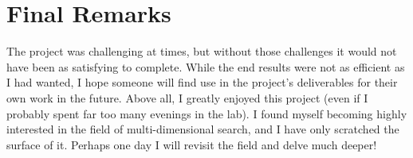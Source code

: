 \section{Final Remarks}

The project was challenging at times, but without those challenges it would not have been as satisfying to complete. While the end results were not as efficient as I had wanted, I hope someone will find use in the project's deliverables for their own work in the future. Above all, I greatly enjoyed this project (even if I probably spent far too many evenings in the lab). I found myself becoming highly interested in the field of multi-dimensional search, and I have only scratched the surface of it. Perhaps one day I will revisit the field and delve much deeper!